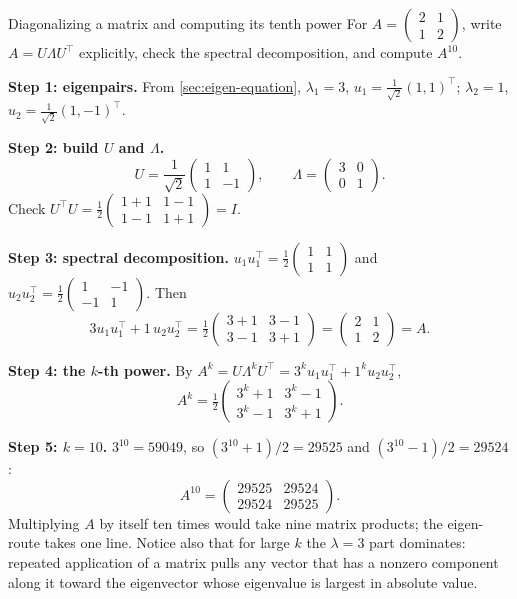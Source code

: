 \begin{sample}{Diagonalizing a matrix and computing its tenth power}
For $A=\begin{pmatrix}2&1\\1&2\end{pmatrix}$, write $A=U\Lambda U^\top$ explicitly, check the spectral decomposition, and compute $A^{10}$.

\textbf{Step 1: eigenpairs.} From \cref{sec:eigen-equation}, $\lambda_1=3$, $u_1=\tfrac1{\sqrt2}(1,1)^\top$; $\lambda_2=1$, $u_2=\tfrac1{\sqrt2}(1,-1)^\top$.

\textbf{Step 2: build $U$ and $\Lambda$.}
\[
U=\frac1{\sqrt2}\begin{pmatrix}1&1\\1&-1\end{pmatrix},\qquad\Lambda=\begin{pmatrix}3&0\\0&1\end{pmatrix}.
\]
Check $U^\top U=\tfrac12\begin{pmatrix}1+1&1-1\\1-1&1+1\end{pmatrix}=I$.

\textbf{Step 3: spectral decomposition.} $u_1u_1^\top=\tfrac12\begin{pmatrix}1&1\\1&1\end{pmatrix}$ and $u_2u_2^\top=\tfrac12\begin{pmatrix}1&-1\\-1&1\end{pmatrix}$. Then
\[
3u_1u_1^\top+1\,u_2u_2^\top=\tfrac12\begin{pmatrix}3+1&3-1\\3-1&3+1\end{pmatrix}=\begin{pmatrix}2&1\\1&2\end{pmatrix}=A.
\]

\textbf{Step 4: the $k$-th power.} By $A^k=U\Lambda^kU^\top=3^ku_1u_1^\top+1^ku_2u_2^\top$,
\[
A^k=\tfrac12\begin{pmatrix}3^k+1&3^k-1\\3^k-1&3^k+1\end{pmatrix}.
\]

\textbf{Step 5: $k=10$.} $3^{10}=59049$, so $(3^{10}+1)/2=29525$ and $(3^{10}-1)/2=29524$:
\[
\boxed{A^{10}=\begin{pmatrix}29525&29524\\29524&29525\end{pmatrix}.}
\]
Multiplying $A$ by itself ten times would take nine matrix products; the eigen-route takes one line. Notice also that for large $k$ the $\lambda=3$ part dominates: repeated application of a matrix pulls any vector that has a nonzero component along it toward the eigenvector whose eigenvalue is largest in absolute value.
\end{sample}

